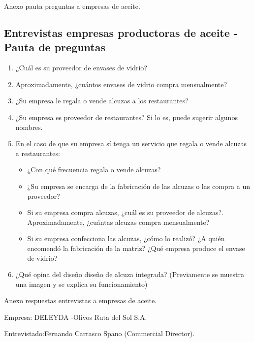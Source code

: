 Anexo pauta preguntas a empresas de aceite. \label{PauEntEmpAce}

\subsection{Entrevistas empresas productoras de aceite - Pauta de preguntas}

\begin{enumerate}
\item ¿Cuál es su proveedor de envases de vidrio?
\item Aproximadamente, ¿cuántos envases de vidrio compra mensualmente?
\item  ¿Su empresa le regala o vende alcuzas a los restaurantes?
\item ¿Su empresa es proveedor de restaurantes? Si lo es, puede sugerir algunos nombres.
\item En el caso de que su empresa sí tenga un servicio que regala o vende alcuzas a restaurantes:
\begin{itemize}
\item ¿Con qué frecuencia regala o vende alcuzas?
\item ¿Su empresa se encarga de la fabricación de las alcuzas o las compra a un proveedor?
\item Si su empresa compra alcuzas, ¿cuál es su proveedor de alcuzas?. Aproximadamente, ¿cuántas alcuzas compra mensualmente?
\item Si su empresa confecciona las alcuzas, ¿cómo lo realizó? ¿A quién encomendó la fabricación de la matriz? ¿Qué empresa produce el envase de vidrio?
\end{itemize}
\item ¿Qué opina del diseño diseño de alcuza integrada? (Previamente se muestra una imagen y se explica su funcionamiento)
\end{enumerate}



Anexo respuestas entrevistas a empresas de aceite. \label{ResEntEmpAce}

Empresa: DELEYDA -Olivos Ruta del Sol S.A.

Entrevistado:Fernando Carrasco Spano (Commercial Director).

